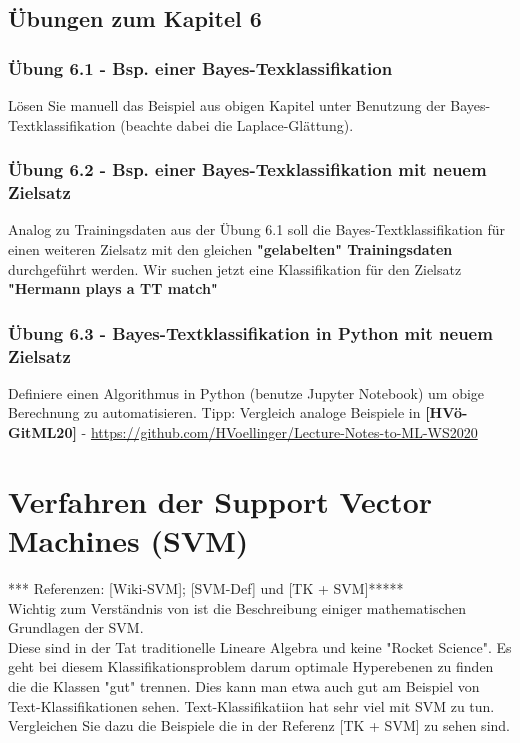 \documentclass[12pt]{article}
\begin{document}
  
\newpage

\subsection{Übungen zum Kapitel 6}

\subsubsection{Übung 6.1 - Bsp. einer Bayes-Texklassifikation}

Lösen Sie manuell das Beispiel aus obigen Kapitel unter Benutzung der  Bayes-Textklassifikation (beachte dabei die Laplace-Glättung).   

\subsubsection{Übung 6.2 - Bsp. einer Bayes-Texklassifikation mit neuem Zielsatz }

Analog zu Trainingsdaten aus der Übung 6.1 soll die Bayes-Textklassifikation für einen weiteren Zielsatz mit den gleichen \textbf{"gelabelten" Trainingsdaten} durchgeführt werden. Wir suchen jetzt eine Klassifikation für den Zielsatz \textbf{"Hermann plays a TT match"}   

\subsubsection{Übung 6.3 - Bayes-Textklassifikation in Python mit neuem Zielsatz}

Definiere einen Algorithmus in Python (benutze Jupyter Notebook) um obige Berechnung zu automatisieren. Tipp: Vergleich analoge Beispiele in \textbf{[HVö-GitML20]} - \url{https://github.com/HVoellinger/Lecture-Notes-to-ML-WS2020}\\


\newpage

\section{Verfahren der Support Vector Machines (SVM)\\} 
%
*** Referenzen: [Wiki-SVM]; [SVM-Def] und  [TK + SVM]*****\\
%
Wichtig zum Verständnis von {\color{blue}{Support Vector Machines (SVM)}} ist die Beschreibung einiger mathematischen Grundlagen der SVM.\\
Diese sind in der Tat traditionelle Lineare Algebra und keine "Rocket Science". Es geht bei diesem Klassifikationsproblem darum optimale Hyperebenen zu finden die die Klassen "gut" trennen.
Dies kann man etwa auch gut am Beispiel von Text-Klassifikationen sehen. Text-Klassifikatiion hat sehr viel mit SVM zu tun. Vergleichen Sie dazu die Beispiele die in der Referenz [TK + SVM] zu sehen sind.
\end{document}

